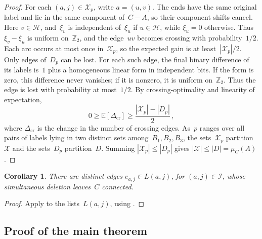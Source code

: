 \documentclass[12pt,reqno,a4paper]{amsart}
\newtheorem{corollary}[theorem]{Corollary}
\begin{document}
\begin{proof}
  For each $(a,j) \in \mathcal X_p$, write $a = (u,v)$. 
  The ends have the same original label and lie in the same component of~$C-A$,
  so their component shifts cancel. 
  Here $v \in \mathcal H$, and~$\xi_v$ is independent of~$\xi_u$ if $u \in
  \mathcal H$, while $\xi_u = 0$ otherwise. 
  Thus $\xi_v - \xi_u$ is uniform on~$\mathbb Z_2$, and the edge~$uv$ becomes
  crossing with probability~$1/2$.
  Each arc occurs at most once in~$\mathcal X_p$, so the expected gain is at
  least~$|\mathcal X_p|/2$.
  Only edges of~$D_p$ can be lost. 
  For each such edge, the final binary difference of its labels is~$1$ plus a
  homogeneous linear form in independent bits. 
  If the form is zero, this difference never vanishes; if it is nonzero, it is
  uniform on~$\mathbb Z_2$. 
  Thus the edge is lost with probability at most~$1/2$.
  By crossing-optimality and linearity of expectation,
  \[
    0 \ge \mathbb E[\Delta_{\mathrm{cr}}]
      \ge \frac{|\mathcal X_p| - |D_p|}{2} \, ,
  \]
  where $\Delta_{\mathrm{cr}}$ is the change in the number of crossing edges.
  As~$p$ ranges over all pairs of labels lying in two distinct sets
  among~$B_1,B_2,B_3$, the sets~$\mathcal X_p$ partition~$\mathcal X$ and the
  sets~$D_p$ partition~$D$.
  Summing $|\mathcal X_p| \le |D_p|$ gives $|\mathcal X| \le |D| = \mu_C(A)$.
\end{proof}

\begin{corollary}\label{cor:support}
  There are distinct edges $e_{a,j} \in L(a,j)$, for $(a,j) \in \mathcal I$,
  whose simultaneous deletion leaves~$C$ connected.
\end{corollary}
\begin{proof}
  Apply  to the lists~$L(a,j)$, using
  .
\end{proof}

\subsection{Proof of the main theorem}
\end{document}
